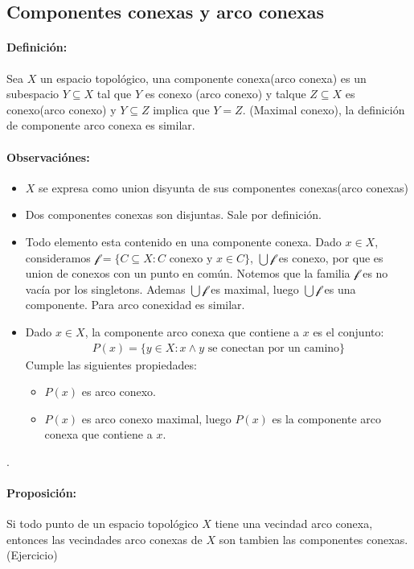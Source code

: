 \subsection{Componentes conexas y arco conexas}
\paragraph{Definición:} Sea $X$ un espacio topológico, una componente conexa(arco conexa) es un subespacio $Y \subseteq X$ tal que $Y$ es conexo (arco conexo) y talque $Z \subseteq X$ es conexo(arco conexo) y $Y \subseteq Z$ implica que $Y = Z$. (Maximal conexo), la definición de componente arco conexa es similar.

\paragraph{Observaciónes:} 
\begin{itemize}
    \item $X$ se expresa como union disyunta de sus componentes conexas(arco conexas)
    \item Dos componentes conexas son disjuntas. Sale por definición.
    \item Todo elemento esta contenido en una componente conexa.
    Dado $x \in X$, consideramos $\mathcal f = \{C \subseteq X: C \text{ conexo y } x \in C\}$, $\bigcup \mathcal f$ es conexo, por que es union de conexos con un punto en común. Notemos que la familia $\mathcal f$ es no vacía por los singletons. Ademas $\bigcup \mathcal f$ es maximal, luego $\bigcup \mathcal f$ es una componente. Para arco conexidad es similar.
    \item Dado $x \in X$, la componente arco conexa que contiene a $x$ es el conjunto:
    \begin{align*}
        P(x) = \{y \in X: x \land y \text{ se conectan por un camino}\}
    \end{align*}
    Cumple las siguientes propiedades:
    \begin{itemize}
        \item $P(x)$ es arco conexo.
        \item $P(x)$ es arco conexo maximal, luego $P(x)$ es la componente arco conexa que contiene a $x$.
    \end{itemize}
\end{itemize}.

\paragraph{Proposición:} Si todo punto de un espacio topológico $X$ tiene una vecindad arco conexa, entonces las vecindades arco conexas de $X$ son tambien las componentes conexas. (Ejercicio)


